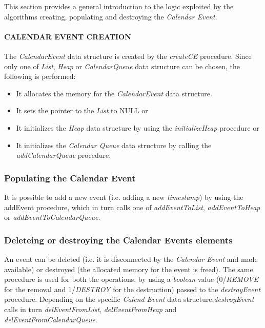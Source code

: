 This section provides a general introduction to the logic exploited by the algorithms creating, populating and destroying the \textit{Calendar Event}.

\paragraph{CALENDAR EVENT CREATION}
The \textit{CalendarEvent} data structure is created by the \textit{createCE} procedure. Since only one of \textit{List}, \textit{Heap} or \textit{CalendarQueue} data structure can be chosen, the following is performed:
\begin{itemize}
\item    It allocates the memory for the \textit{CalendarEvent} data structure.
\item	It sets the pointer to the \textit{List} to NULL or
\item	It initializes the \textit{Heap} data structure by using the \textit{initializeHeap} procedure or
\item	It initializes the \textit{Calendar Queue} data structure by calling the \textit{addCalendarQueue}  procedure.
\end{itemize}



\subsubsection{Populating the Calendar Event}

It is possible to add a new event (i.e. adding a new \textit{timestamp}) by using the addEvent procedure, which in turn calls one of \textit{addEventToList}, \textit{addEventToHeap} 
or \textit{addEventToCalendarQueue}.

\subsubsection{Deleteing or destroying the Calendar Events elements}

An event can be deleted (i.e. it is disconnected by the \textit{Calendar Event} and made available) or destroyed (the allocated memory for the event is freed). 
The same procedure is used for both the operations, by using a \textit{boolean} value (0/\textit{REMOVE} for the removal and 1/\textit{DESTROY} for the destruction)
 passed to the \textit{destroyEvent} procedure. Depending on the specific \textit{Calend Event} data structure,\textit{destroyEvent} calls in turn 
 \textit{delEventFromList}, \textit{delEventFromHeap} and \textit{delEventFromCalendarQueue}.


